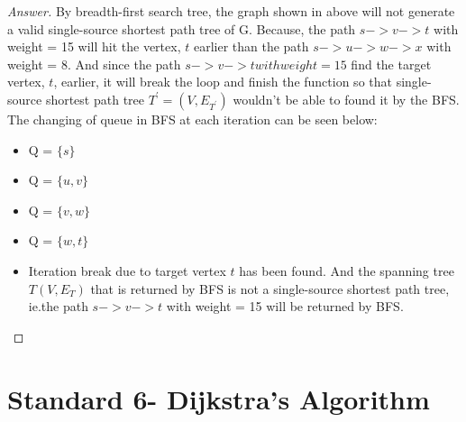 \documentclass[11pt]{article}
\theoremstyle{definition}
\theoremstyle{definition}
\theoremstyle{definition}
\begin{document}
\begin{proof}[Answer]
By breadth-first search tree, the graph shown in above will not generate a valid single-source shortest path tree of G. Because, the path $s->v->t$ with weight = 15 will hit the vertex, $t$ earlier than the path $s->u->w->x$ with weight = 8. And since the path $s->v->t with weight =15$ find the target vertex, $t$, earlier, it will break the loop and finish the function so that single-source shortest path tree $T^{\prime} = (V,E_{T^{\prime}})$ wouldn't be able to found it by the BFS. 
The changing of queue in BFS at each iteration can be seen below:
\begin{itemize}
\item Q = $\{s\}$
\item Q = $\{u,v\}$
\item Q = $\{v,w\}$
\item Q = $\{w,t\}$
\item Iteration break due to target vertex $t$ has been found. And the spanning tree $T(V, E_{T})$ that is returned by BFS is not a single-source shortest path tree, ie.the path $s->v->t$ with weight = 15 will be returned by BFS.
\end{itemize}
\end{proof}




\newpage
\section{Standard 6- Dijkstra's Algorithm}
\end{document}
